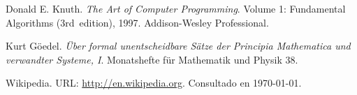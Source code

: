 \documentclass[a4paper,10pt,twocolumn]{article}
\begin{document}
\begin{thebibliography}{99}
	 Donald E. Knuth. \emph{The Art of Computer Programming}.
		Volume 1: Fundamental Algorithms (3rd~edition), 1997.
		Addison-Wesley Professional.

	 Kurt Göedel. \emph{Über formal unentscheidbare Sätze der
		Principia Mathematica und verwandter Systeme, I}.
		Monatshefte für Mathematik und Physik 38.

	 Wikipedia. URL: \href{http://en.wikipedia.org}
	  {http://en.wikipedia.org}.
		Consultado en \today.

\end{thebibliography}


\label{end}
\end{document}

